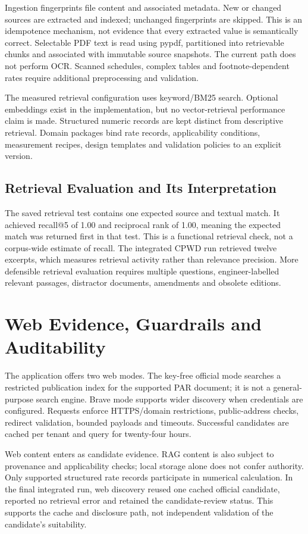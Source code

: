 \documentclass[11pt,a4paper]{article}
\begin{document}
Ingestion fingerprints file content and associated metadata. New or changed sources are extracted and indexed; unchanged fingerprints are skipped. This is an idempotence mechanism, not evidence that every extracted value is semantically correct. Selectable PDF text is read using pypdf, partitioned into retrievable chunks and associated with immutable source snapshots. The current path does not perform OCR. Scanned schedules, complex tables and footnote-dependent rates require additional preprocessing and validation.

The measured retrieval configuration uses keyword/BM25 search. Optional embeddings exist in the implementation, but no vector-retrieval performance claim is made. Structured numeric records are kept distinct from descriptive retrieval. Domain packages bind rate records, applicability conditions, measurement recipes, design templates and validation policies to an explicit version.

\subsection{Retrieval Evaluation and Its Interpretation}
The saved retrieval test contains one expected source and textual match. It achieved recall@5 of 1.00 and reciprocal rank of 1.00, meaning the expected match was returned first in that test. This is a functional retrieval check, not a corpus-wide estimate of recall. The integrated CPWD run retrieved twelve excerpts, which measures retrieval activity rather than relevance precision. More defensible retrieval evaluation requires multiple questions, engineer-labelled relevant passages, distractor documents, amendments and obsolete editions.

\section{Web Evidence, Guardrails and Auditability}
The application offers two web modes. The key-free official mode searches a restricted publication index for the supported PAR document; it is not a general-purpose search engine. Brave mode supports wider discovery when credentials are configured. Requests enforce HTTPS/domain restrictions, public-address checks, redirect validation, bounded payloads and timeouts. Successful candidates are cached per tenant and query for twenty-four hours.

Web content enters as candidate evidence. RAG content is also subject to provenance and applicability checks; local storage alone does not confer authority. Only supported structured rate records participate in numerical calculation. In the final integrated run, web discovery reused one cached official candidate, reported no retrieval error and retained the candidate-review status. This supports the cache and disclosure path, not independent validation of the candidate's suitability.
\end{document}
